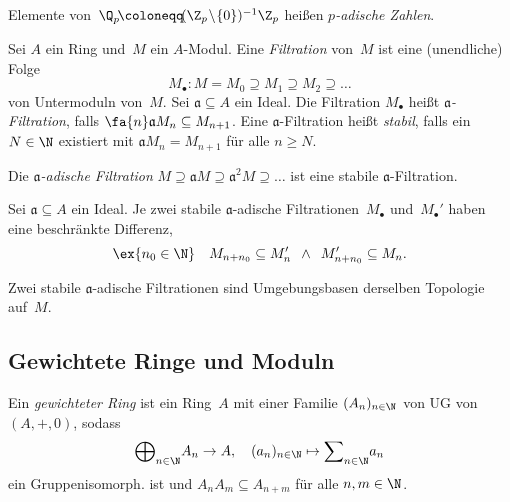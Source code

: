 \documentclass{cheat-sheet}
\newcommand{\aaa}{\mathfrak{a}}
\begin{document}
\begin{defn}
  Elemente von~$\Q_p \!\coloneqq\! (\Z_p \!\setminus\! \{ 0 \})^{-1} \Z_p$ heißen \emph{$p$-adische Zahlen}.
\end{defn}



\begin{defn}
  Sei $A$ ein Ring und~$M$ ein $A$-Modul.
  Eine \emph{Filtration} von~$M$ ist eine (unendliche) Folge
  \[
    M_\bullet : M = M_0 \supseteq M_1 \supseteq M_2 \supseteq \ldots
  \]
  von Untermoduln von~$M$.
  Sei $\aaa \subseteq A$ ein Ideal.
  Die Filtration $M_\bullet$ heißt \emph{$\aaa$-Filtration}, falls $\fa{n} \aaa M_n \subseteq M_{n+1}$.
  Eine $\aaa$-Filtration heißt \emph{stabil}, falls ein $N \in \N$ existiert mit $\aaa M_n = M_{n+1}$ für alle $n \geq N$.
\end{defn}

\begin{bsp}
  Die \emph{$\aaa$-adische Filtration} $M \supseteq \aaa M \supseteq \aaa^2 M \supseteq \ldots$ ist eine stabile $\aaa$-Filtration.
\end{bsp}

\begin{lem}
  Sei $\aaa \subseteq A$ ein Ideal.
  Je zwei stabile $\aaa$-adische Filtrationen~$M_\bullet$ und~$M_\bullet'$ haben eine beschränkte Differenz, \dh{}
  \[
    \ex{n_0 \in \N} \quad
    M_{n + n_0} \subseteq M'_n
    \enspace\wedge\enspace
    M'_{n + n_0} \subseteq M_n.
  \]
\end{lem}

\begin{kor}
  Zwei stabile $\aaa$-adische Filtrationen sind Umgebungsbasen derselben Topologie auf~$M$.
\end{kor}

\subsection{Gewichtete Ringe und Moduln}


\begin{defn}
  Ein \emph{gewichteter Ring} ist ein Ring~$A$ mit einer Familie $(A_n)_{n \in \N}$ von UG von $(A, +, 0)$, sodass
  \[
    {\bigoplus}_{n \in \N} A_n \to A, \quad
    (a_n)_{n \in \N} \mapsto {\sum}_{n \in \N} a_n
  \]
  ein Gruppenisomorph. ist und $A_n A_m \subseteq A_{n+m}$ für alle $n, m \in \N$.
\end{defn}
\end{document}
